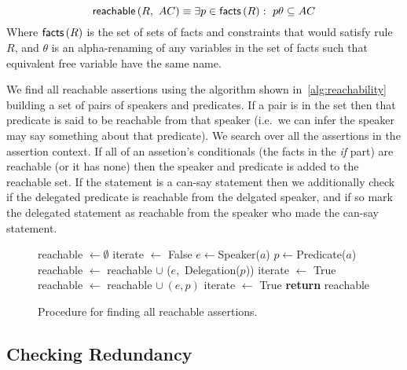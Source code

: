 \documentclass[a4paper]{article}
\begin{document}
\begin{equation}
  \textsf{reachable}\left(R,~AC\right)\equiv\exists p\in\textsf{facts}\left(R\right):~p\theta\subseteq AC
\end{equation}
Where $\textsf{facts}\left(R\right)$ is the set of sets of facts and constraints that would satisfy rule $R$, and $\theta$ is an alpha-renaming of any variables in the set of facts such that equivalent free variable have the same name.

We find all reachable assertions using the algorithm shown in~\autoref{alg:reachability} building a set of pairs of speakers and predicates.  If a pair is in the set then that predicate is said to be reachable from that speaker (i.e.~we can infer the speaker may say something about that predicate).  
We search over all the assertions in the assertion context.  If all of an assetion's conditionals (the facts in the \emph{if} part) are reachable (or it has none) then the speaker and predicate is added to the reachable set.  If the statement is a can-say statement then we additionally check if the delegated predicate is reachable from the delgated speaker, and if so mark the delegated statement as reachable from the speaker who made the can-say statement.

\begin{figure}
\begin{algorithmic}
  \State reachable $\gets \emptyset$
  \Repeat
    \State iterate $\gets$ False
      \State $e \gets $Speaker($a$)
      \State $p \gets $Predicate($a$)
            \State reachable $\gets$ reachable $\cup$ ($e,$ Delegation($p$))
            \State iterate $\gets$ True
          \EndIf
        \EndIf
          \State reachable $\gets$ reachable $\cup~(e,p)$
          \State iterate $\gets$ True
        \EndIf
      \EndIf
    \EndFor
  \State \textbf{return} reachable
\EndProcedure
\end{algorithmic}
\caption{Procedure for finding all reachable assertions.}
\label{alg:reachability}
\end{figure}

\subsection{Checking Redundancy}
\end{document}
